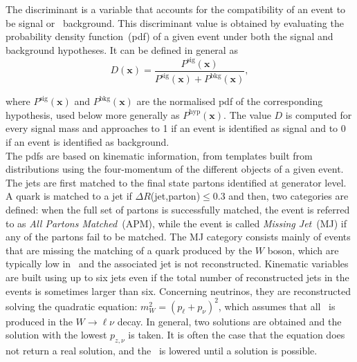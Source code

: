 The discriminant is a variable that accounts for the compatibility of an event to be signal or \ttbar\ background. This discriminant value is obtained by evaluating the probability density function~(pdf) of a given event under both the signal and background hypotheses. It can be defined in general as
\begin{equation}
    D(\textbf{x})=\frac{P^{\text{sig}}(\textbf{x})}{P^{\text{sig}}(\textbf{x})+P^{\text{bkg}}(\textbf{x})},
    \label{eq3:discriminant}
\end{equation}

where $P^{\text{sig}}(\textbf{x})$ and $P^{\text{bkg}}(\textbf{x})$ are the normalised pdf of the corresponding hypothesis, used below more generally as $P^{\text{hyp}}(\textbf{x})$. The value $D$ is computed for every signal mass and approaches to 1 if an event is identified as signal and to 0 if an event is identified as background.\\

The pdfs are based on kinematic information, from templates built from distributions using the four-momentum of the different objects of a given event. The jets are first matched to the final state partons identified at generator level. A quark is matched to a jet if $\Delta R$(jet,parton)$\leq 0.3$ and then, two categories are defined: when the full set of partons is successfully matched, the event is referred to as \textit{All Partons Matched}~(APM), while the event is called \textit{Missing Jet}~(MJ) if any of the partons fail to be matched. The MJ category consists mainly of events that are missing the matching of a quark produced by the $W$ boson, which are typically low in \pT\ and the associated jet is not reconstructed. Kinematic variables are built using up to six jets even if the total number of reconstructed jets in the events is sometimes larger than six. %
Concerning neutrinos, they are reconstructed solving the quadratic equation: $m_W^2 = (p_\ell + p_\nu)^2$, which assumes that all \MET\ is produced in the $W\to\ell\nu$ decay. In general, two solutions are obtained and the solution with the lowest $p_{z,\nu}$ is taken. It is often the case that the equation does not return a real solution, and the \MET\ is lowered until a solution is possible.\\

